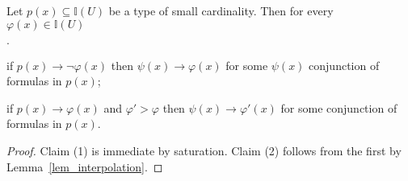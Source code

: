 \documentclass[11pt,oneside]{amsart}
\newcommand{\mylabel}[1]{{#1}\hfill}
\renewenvironment{itemize}
  {\begin{list}{$\cdot$}{%
  \setlength{\parskip}{0mm}
  \setlength{\topsep}{.2\baselineskip}
  \setlength{\rightmargin}{0mm}
  \setlength{\listparindent}{0mm}
  \setlength{\itemindent}{0mm}
  \setlength{\labelwidth}{3ex}
  \setlength{\itemsep}{.2\baselineskip}
  \setlength{\parsep}{.2\baselineskip}
  \setlength{\partopsep}{0mm}
  \setlength{\labelsep}{1ex}
  \setlength{\leftmargin}{\labelwidth+\labelsep}
  \let\makelabel\mylabel}}{%
\end{list}}
\begin{document}
\begin{fact}\label{fact_compactness_imp}
  Let $p(x)\subseteq\mathds{I}(U)$ be a type of small cardinality.
  Then for every  $\varphi(x)\in\mathds{I}(U)$
  \begin{itemize}
    \item[1.] if $p(x)\rightarrow\neg\varphi(x)$ then $\psi(x)\rightarrow\varphi(x)$ for some $\psi(x)$ conjunction of formulas in $p(x)$;
    \item[2.] if $p(x)\rightarrow\varphi(x)$ and $\varphi'>\varphi$ then $\psi(x)\rightarrow\varphi'(x)$ for some conjunction of formulas in $p(x)$.
  \end{itemize} 
\end{fact}

\begin{proof}
  Claim (1) is immediate by saturation.
  Claim (2) follows from the first by Lemma~\ref{lem_interpolation}.
\end{proof}



  











\end{document}
